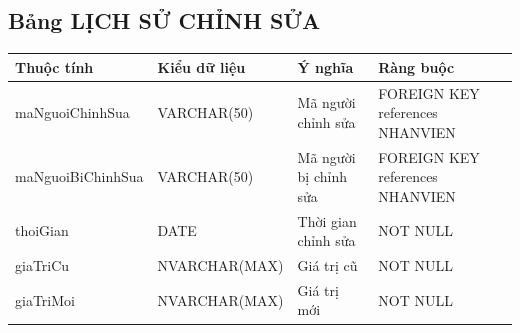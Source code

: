 \documentclass[a4paper,12pt]{report}
\begin{document}
\subsection{Bảng LỊCH SỬ CHỈNH SỬA}
\noindent
\begin{center}
    \begin{longtable}{|>{\centering\arraybackslash}p{4.5cm}|
        >{\centering\arraybackslash}p{4.2cm}|
        >{\centering\arraybackslash}p{2.5cm}|
        >{\centering\arraybackslash}p{3.8cm}|}
        \hline
        \textbf{Thuộc tính}                                                                                                               &
        \textbf{Kiểu dữ liệu}                                                                                                                             &
        \textbf{Ý nghĩa}                                                                                                 &
        \textbf{Ràng buộc}                                                                                                         \\
        \hline
        maNguoiChinhSua &  VARCHAR(50)  & Mã người chỉnh sửa & FOREIGN KEY references NHANVIEN \\
        \hline
        maNguoiBiChinhSua &  VARCHAR(50)  & Mã người bị chỉnh sửa & FOREIGN KEY references NHANVIEN \\                                                                                                                          
        \hline
        thoiGian &  DATE  & Thời gian chỉnh sửa & NOT NULL \\                                                                                                                          
        \hline
        giaTriCu &  NVARCHAR(MAX)  & Giá trị cũ & NOT NULL\\                                                                                                                          
        \hline
        giaTriMoi & NVARCHAR(MAX)  & Giá trị mới & NOT NULL \\                                                                                                                          
        \hline
    \end{longtable}
\end{center}
\end{document}
